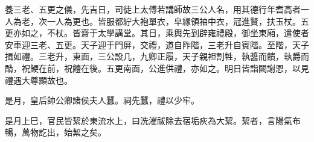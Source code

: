 \begin{pinyinscope}
養三老、五更之儀，先吉日，司徒上太傅若講師故三公人名，用其德行年耆高者一人為老，次一人為更也。皆服都紵大袍單衣，皁緣領袖中衣，冠進賢，扶玉杖。五更亦如之，不杖。皆齋于太學講堂。其日，乘輿先到辟雍禮殿，御坐東廂，遣使者安車迎三老、五更。天子迎于門屏，交禮，道自阼階，三老升自賓階。至階，天子揖如禮。三老升，東面，三公設几，九卿正履，天子親袒割牲，執醬而饋，執爵而酳，祝鯁在前，祝饐在後。五更南面，公進供禮，亦如之。明日皆詣闕謝恩，以見禮遇大尊顯故也。

是月，皇后帥公卿諸侯夫人蠶。祠先蠶，禮以少牢。

是月上巳，官民皆絜於東流水上，曰洗濯祓除去宿垢疢為大絜。絜者，言陽氣布暢，萬物訖出，始絜之矣。


\end{pinyinscope}